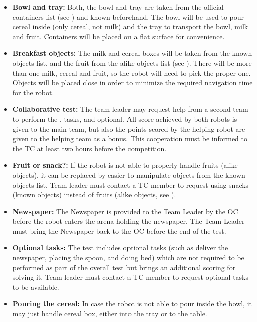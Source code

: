 \begin{itemize}
	\item \textbf{Bowl and tray:} Both, the bowl and tray are taken from the official containers list (see ) and known beforehand. The bowl will be used to pour cereal inside (only cereal, not milk) and the tray to transport the bowl, milk and fruit. Containers will be placed on a flat surface for convenience.

	\item \textbf{Breakfast objects:} The milk and cereal boxes will be taken from the known objects list, and the fruit from the alike objects list (see ). There will be more than one milk, cereal and fruit, so the robot will need to pick the proper one. Objects will be placed close in order to minimize the required navigation time for the robot.

	\item \textbf{Collaborative test:} The team leader may request help from a second team to perform the ,  tasks, and  optional. All score achieved by both robots is given to the main team, but also the points scored by the helping-robot are given to the helping team as a bonus. This cooperation must be informed to the TC at least two hours before the competition.

	\item \textbf{Fruit or snack?:} If the robot is not able to properly handle fruits (alike objects), it can be replaced by easier-to-manipulate objects from the known objects list. Team leader must contact a TC member to request using snacks (known objects) instead of fruits (alike objects, see ).

	\item \textbf{Newspaper:} The Newspaper is provided to the Team Leader by the OC before the robot enters the arena holding the newspaper. The Team Leader must bring the Newspaper back to the OC before the end of the test.

	\item \textbf{Optional tasks:} The test includes optional tasks (such as deliver the newspaper, placing the spoon, and doing bed) which are not required to be performed as part of the overall test but brings an additional scoring for solving it. Team leader must contact a TC member to request optional tasks to be available.

	\item \textbf{Pouring the cereal:} In case the robot is not able to pour inside the bowl, it may just handle cereal box, either into the tray or to the table.


\end{itemize}
